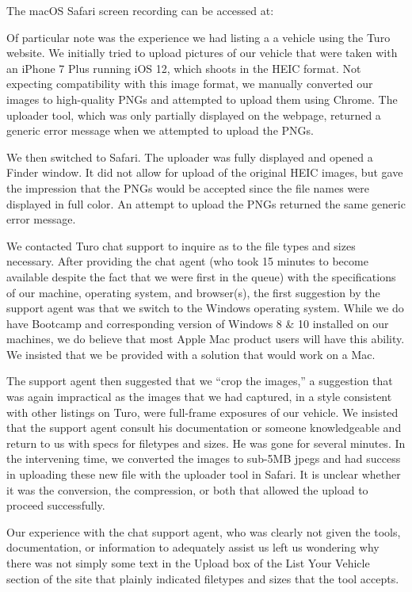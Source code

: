\documentclass[review,12pt]{elsarticle}
\begin{document}
  The macOS Safari screen recording can be accessed at: 

  Of particular note was the experience we had listing a a vehicle using the Turo website. We initially tried to upload pictures of our vehicle that were taken with an iPhone 7 Plus running iOS 12, which shoots in the HEIC format. Not expecting compatibility with this image format, we manually converted our images to high-quality PNGs and attempted to upload them using Chrome. The uploader tool, which was only partially displayed on the webpage, returned a generic error message when we attempted to upload the PNGs.

  We then switched to Safari. The uploader was fully displayed and opened a Finder window. It did not allow for upload of the original HEIC images, but gave the impression that the PNGs would be accepted since the file names were displayed in full color. An attempt to upload the PNGs returned the same generic error message.

  We contacted Turo chat support to inquire as to the file types and sizes necessary. After providing the chat agent (who took 15 minutes to become available despite the fact that we were first in the queue) with the specifications of our machine, operating system, and browser(s), the first suggestion by the support agent was that we switch to the Windows operating system. While we do have Bootcamp and corresponding version of Windows 8 & 10 installed on our machines, we do believe that most Apple Mac product users will have this ability. We insisted that we be provided with a solution that would work on a Mac.

  The support agent then suggested that we ``crop the images,'' a suggestion that was again impractical as the images that we had captured, in a style consistent with other listings on Turo, were full-frame exposures of our vehicle. We insisted that the support agent consult his documentation or someone knowledgeable and return to us with specs for filetypes and sizes. He was gone for several minutes. In the intervening time, we converted the images to sub-5MB jpegs and had success in uploading these new file with the uploader tool in Safari. It is unclear whether it was the conversion, the compression, or both that allowed the upload to proceed successfully.

  Our experience with the chat support agent, who was clearly not given the tools, documentation, or information to adequately assist us left us wondering why there was not simply some text in the Upload box of the List Your Vehicle section of the site that plainly indicated filetypes and sizes that the tool accepts.
\end{document}
